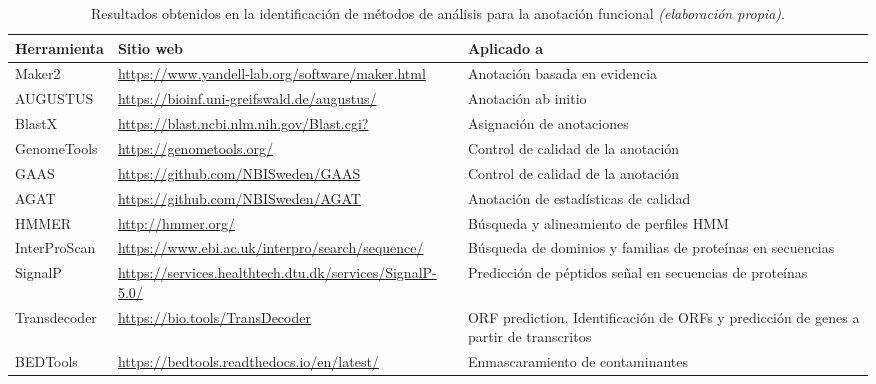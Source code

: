 \documentclass[12pt]{article}
\begin{document}
\newpage

\begin{table}[htbp]
    \centering
    \caption{Resultados obtenidos en la identificación de métodos de análisis para la anotación funcional \emph{(elaboración propia)}.}
    \label{tabla:anotacion_funcional}
    \begin{tabularx}{\textwidth}{|p{3cm}|X|X|}
        \hline
        \textbf{Herramienta} & \textbf{Sitio web} & \textbf{Aplicado a} \\
        \hline
        Maker2 & \href{https://www.yandell-lab.org/software/maker.html}{\url{https://www.yandell-lab.org/software/maker.html}} & Anotación basada en evidencia \\
        \hline
        AUGUSTUS & \href{https://bioinf.uni-greifswald.de/augustus/}{\url{https://bioinf.uni-greifswald.de/augustus/}} & Anotación ab initio \\
        \hline
        BlastX & \href{https://blast.ncbi.nlm.nih.gov/Blast.cgi?}{\url{https://blast.ncbi.nlm.nih.gov/Blast.cgi?}} & Asignación de anotaciones \\
        \hline
        GenomeTools & \href{https://genometools.org/}{\url{https://genometools.org/}} & Control de calidad de la anotación \\
        \hline
        GAAS & \href{https://github.com/NBISweden/GAAS}{\url{https://github.com/NBISweden/GAAS}} & Control de calidad de la anotación \\
        \hline
        AGAT & \href{https://github.com/NBISweden/AGAT}{\url{https://github.com/NBISweden/AGAT}} & Anotación de estadísticas de calidad \\
        \hline
        HMMER & \href{http://hmmer.org/}{\url{http://hmmer.org/}} & Búsqueda y alineamiento de perfiles HMM \\
        \hline
        InterProScan & \href{https://www.ebi.ac.uk/interpro/search/sequence/}{\url{https://www.ebi.ac.uk/interpro/search/sequence/}} & Búsqueda de dominios y familias de proteínas en secuencias \\
        \hline
        SignalP & \href{https://services.healthtech.dtu.dk/services/SignalP-5.0/}{\url{https://services.healthtech.dtu.dk/services/SignalP-5.0/}} & Predicción de péptidos señal en secuencias de proteínas \\
        \hline
        Transdecoder & \href{https://bio.tools/TransDecoder}{\url{https://bio.tools/TransDecoder}} & ORF prediction, Identificación de ORFs y predicción de genes a partir de transcritos \\
        \hline
        BEDTools & \href{https://bedtools.readthedocs.io/en/latest/}{\url{https://bedtools.readthedocs.io/en/latest/}} & Enmascaramiento de contaminantes \\
        \hline
    \end{tabularx}
\end{table}
\end{document}
